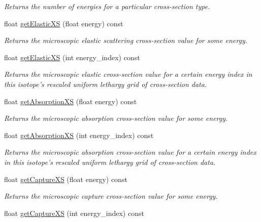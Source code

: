 \begin{DoxyCompactItemize}
\begin{DoxyCompactList}\small\item\em Returns the number of energies for a particular cross-\/section type. \end{DoxyCompactList}\item 
float \hyperlink{classIsotope_a53d04a9a711e4bef92c295739eeb76ab}{get\-Elastic\-X\-S} (float energy) const 
\begin{DoxyCompactList}\small\item\em Returns the microscopic elastic scattering cross-\/section value for some energy. \end{DoxyCompactList}\item 
float \hyperlink{classIsotope_a94493acad07eda936488edbffb48c976}{get\-Elastic\-X\-S} (int energy\-\_\-index) const 
\begin{DoxyCompactList}\small\item\em Returns the microscopic elastic cross-\/section value for a certain energy index in this isotope's rescaled uniform lethargy grid of cross-\/section data. \end{DoxyCompactList}\item 
float \hyperlink{classIsotope_ab0ba42960ecd18d9e6e0e995e99c2bf4}{get\-Absorption\-X\-S} (float energy) const 
\begin{DoxyCompactList}\small\item\em Returns the microscopic absorption cross-\/section value for some energy. \end{DoxyCompactList}\item 
float \hyperlink{classIsotope_a4ecbc76ad446036895ab662403214394}{get\-Absorption\-X\-S} (int energy\-\_\-index) const 
\begin{DoxyCompactList}\small\item\em Returns the microscopic absorption cross-\/section value for a certain energy index in this isotope's rescaled uniform lethargy grid of cross-\/section data. \end{DoxyCompactList}\item 
float \hyperlink{classIsotope_ac3695cc4550df5282a224d4d04701db5}{get\-Capture\-X\-S} (float energy) const 
\begin{DoxyCompactList}\small\item\em Returns the microscopic capture cross-\/section value for some energy. \end{DoxyCompactList}\item 
float \hyperlink{classIsotope_ab1482ecf1e1f4e194eda2871673b5383}{get\-Capture\-X\-S} (int energy\-\_\-index) const 

\end{DoxyCompactItemize}
